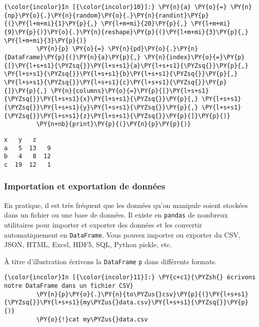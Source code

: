     \begin{Verbatim}[commandchars=\\\{\}]
{\color{incolor}In [{\color{incolor}10}]:} \PY{n}{a} \PY{o}{=} \PY{n}{np}\PY{o}{.}\PY{n}{random}\PY{o}{.}\PY{n}{randint}\PY{p}{(}\PY{l+m+mi}{1}\PY{p}{,} \PY{l+m+mi}{20}\PY{p}{,} \PY{l+m+mi}{9}\PY{p}{)}\PY{o}{.}\PY{n}{reshape}\PY{p}{(}\PY{l+m+mi}{3}\PY{p}{,} \PY{l+m+mi}{3}\PY{p}{)}
         \PY{n}{p} \PY{o}{=} \PY{n}{pd}\PY{o}{.}\PY{n}{DataFrame}\PY{p}{(}\PY{n}{a}\PY{p}{,} \PY{n}{index}\PY{o}{=}\PY{p}{[}\PY{l+s+s1}{\PYZsq{}}\PY{l+s+s1}{a}\PY{l+s+s1}{\PYZsq{}}\PY{p}{,} \PY{l+s+s1}{\PYZsq{}}\PY{l+s+s1}{b}\PY{l+s+s1}{\PYZsq{}}\PY{p}{,} \PY{l+s+s1}{\PYZsq{}}\PY{l+s+s1}{c}\PY{l+s+s1}{\PYZsq{}}\PY{p}{]}\PY{p}{,} \PY{n}{columns}\PY{o}{=}\PY{p}{[}\PY{l+s+s1}{\PYZsq{}}\PY{l+s+s1}{x}\PY{l+s+s1}{\PYZsq{}}\PY{p}{,} \PY{l+s+s1}{\PYZsq{}}\PY{l+s+s1}{y}\PY{l+s+s1}{\PYZsq{}}\PY{p}{,} \PY{l+s+s1}{\PYZsq{}}\PY{l+s+s1}{z}\PY{l+s+s1}{\PYZsq{}}\PY{p}{]}\PY{p}{)}
         \PY{n+nb}{print}\PY{p}{(}\PY{n}{p}\PY{p}{)}
\end{Verbatim}


    \begin{Verbatim}[commandchars=\\\{\}]
    x   y   z
a   5  13   9
b   4   8  12
c  19  12   1

    \end{Verbatim}

    \hypertarget{importation-et-exportation-de-donnuxe9es}{%
\subsubsection{Importation et exportation de
données}\label{importation-et-exportation-de-donnuxe9es}}

    En pratique, il est très fréquent que les données qu'on manipule soient
stockées dans un fichier ou une base de données. Il existe en
\texttt{pandas} de nombreux utilitaires pour importer et exporter des
données et les convertir automatiquement en \texttt{DataFrame}. Vous
pouvez importer ou exporter du CSV, JSON, HTML, Excel, HDF5, SQL, Python
pickle, etc.

    À titre d'illustration écrivons la \texttt{DataFrame} \texttt{p} dans
différents formats.

    \begin{Verbatim}[commandchars=\\\{\}]
{\color{incolor}In [{\color{incolor}11}]:} \PY{c+c1}{\PYZsh{} écrivons notre DataFrame dans un fichier CSV}
         \PY{n}{p}\PY{o}{.}\PY{n}{to\PYZus{}csv}\PY{p}{(}\PY{l+s+s1}{\PYZsq{}}\PY{l+s+s1}{my\PYZus{}data.csv}\PY{l+s+s1}{\PYZsq{}}\PY{p}{)}
         \PY{o}{!}cat my\PYZus{}data.csv
\end{Verbatim}


